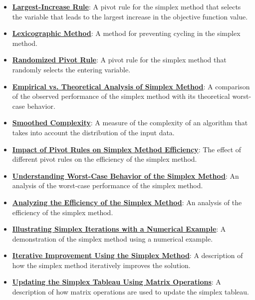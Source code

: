\documentclass{article}%
\begin{document}
\begin{itemize}[leftmargin=*]
\item \href{https://www.math.purdue.edu/~yipn/421/2024-12-03-Duality.pdf#page=1}{\textbf{Largest{-}Increase Rule}}: A pivot rule for the simplex method that selects the variable that leads to the largest increase in the objective function value. %
\item \href{https://www.math.purdue.edu/~yipn/421/2024-12-03-Duality.pdf#page=1}{\textbf{Lexicographic Method}}: A method for preventing cycling in the simplex method. %
\item \href{https://www.math.purdue.edu/~yipn/421/2024-12-03-Duality.pdf#page=1}{\textbf{Randomized Pivot Rule}}: A pivot rule for the simplex method that randomly selects the entering variable. %
\item \href{https://www.math.purdue.edu/~yipn/421/2024-12-03-Duality.pdf#page=1}{\textbf{Empirical vs. Theoretical Analysis of Simplex Method}}: A comparison of the observed performance of the simplex method with its theoretical worst-case behavior. %
\item \href{https://www.math.purdue.edu/~yipn/421/2024-12-03-Duality.pdf#page=1}{\textbf{Smoothed Complexity}}: A measure of the complexity of an algorithm that takes into account the distribution of the input data. %
\item \href{https://www.math.purdue.edu/~yipn/421/2024-12-03-Duality.pdf#page=1}{\textbf{Impact of Pivot Rules on Simplex Method Efficiency}}: The effect of different pivot rules on the efficiency of the simplex method. %
\item \href{https://www.math.purdue.edu/~yipn/421/2024-12-03-Duality.pdf#page=1}{\textbf{Understanding Worst{-}Case Behavior of the Simplex Method}}: An analysis of the worst-case performance of the simplex method. %
\item \href{https://www.math.purdue.edu/~yipn/421/2024-12-03-Duality.pdf#page=1}{\textbf{Analyzing the Efficiency of the Simplex Method}}: An analysis of the efficiency of the simplex method. %
\item \href{https://www.math.purdue.edu/~yipn/421/2024-12-03-Duality.pdf#page=1}{\textbf{Illustrating Simplex Iterations with a Numerical Example}}: A demonstration of the simplex method using a numerical example. %
\item \href{https://www.math.purdue.edu/~yipn/421/2024-12-03-Duality.pdf#page=1}{\textbf{Iterative Improvement Using the Simplex Method}}: A description of how the simplex method iteratively improves the solution. %
\item \href{https://www.math.purdue.edu/~yipn/421/2024-12-03-Duality.pdf#page=1}{\textbf{Updating the Simplex Tableau Using Matrix Operations}}: A description of how matrix operations are used to update the simplex tableau. %

\end{itemize}
\end{document}

